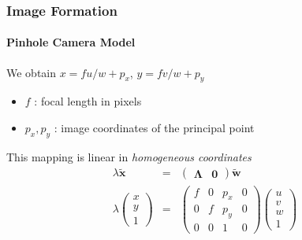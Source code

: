 \documentclass[xetex,professionalfont]{beamer}
\renewcommand{\vec}[1]{\ensuremath{\mathbf{#1}}}
\newcommand{\vw}{\vec{w}}
\newcommand{\vx}{\vec{x}}
\newcommand{\intr}{\boldsymbol{\Lambda}}
\begin{document}
\begin{frame}
\frametitle{Image Formation}
\framesubtitle{Pinhole Camera Model}

We obtain $x=fu/w+p_x$, $y=fv/w+p_y$ %
\begin{itemize}
    \item $f$ : focal length in pixels %
    \item $p_x,p_y$ : image coordinates of the principal point %
\end{itemize}

\bigskip
This mapping is linear in \emph{homogeneous coordinates} %
\begin{eqnarray*}
    \lambda
    \tilde{\vx} &=& %
    \begin{pmatrix}
         \intr & \vec{0} %
     \end{pmatrix} \tilde{\vw} \\
     \lambda
    \begin{pmatrix}
        x \\ y \\ 1
    \end{pmatrix} &=& 
    \begin{pmatrix}
        f & 0 & p_x & 0 \\ 0 & f & p_y & 0 \\ 0 & 0 & 1 & 0
    \end{pmatrix}
    \begin{pmatrix}
        u \\ v \\ w \\ 1
    \end{pmatrix}
\end{eqnarray*} %

\end{frame}
\end{document}

